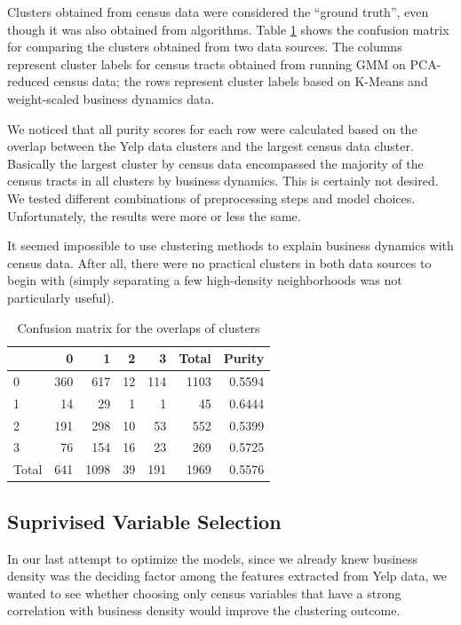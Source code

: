 \documentclass[compsoc]{IEEEtran}
\let\MYoriglatexcaption\caption
\renewcommand{\caption}[2][\relax]{\MYoriglatexcaption[#2]{#2}}
\begin{document}
Clusters obtained from census data were considered the ``ground truth'', even though it was also obtained from algorithms. Table \ref{confusion-1} shows the confusion matrix for comparing the clusters obtained from two data sources. The columns represent cluster labels for census tracts obtained from running GMM on PCA-reduced census data; the rows represent cluster labels based on K-Means and weight-scaled business dynamics data.

We noticed that all purity scores for each row were calculated based on the overlap between the Yelp data clusters and the largest census data cluster. Basically the largest cluster by census data encompassed the majority of the census tracts in all clusters by business dynamics. This is certainly not desired. We tested different combinations of preprocessing steps and model choices. Unfortunately, the results were more or less the same.

It seemed impossible to use clustering methods to explain business dynamics with census data. After all, there were no practical clusters in both data sources to begin with (simply separating a few high-density neighborhoods was not particularly useful).

\begin{table}[h]
\centering
\caption{Confusion matrix for the overlaps of clusters}
\label{confusion-1}
\bgroup
\def\arraystretch{1.5}
\begin{tabular}{lrrrr|r|r}
\toprule
{} &    0 &     1 &   2 &    3 &  Total &  Purity \\
\hline
0     &  360 &   617 &  12 &  114 &   1103 &  0.5594 \\
1     &   14 &    29 &   1 &    1 &     45 &  0.6444 \\
2     &  191 &   298 &  10 &   53 &    552 &  0.5399 \\
3     &   76 &   154 &  16 &   23 &    269 &  0.5725 \\
\hline
Total &  641 &  1098 &  39 &  191 &   1969 &  0.5576 \\
\bottomrule
\end{tabular}
\egroup
\end{table}

\subsection{Suprivised Variable Selection}

In our last attempt to optimize the models, since we already knew business density was the deciding factor among the features extracted from Yelp data, we wanted to see whether choosing only  census variables that have a strong correlation with business density would improve the clustering outcome.
\end{document}
